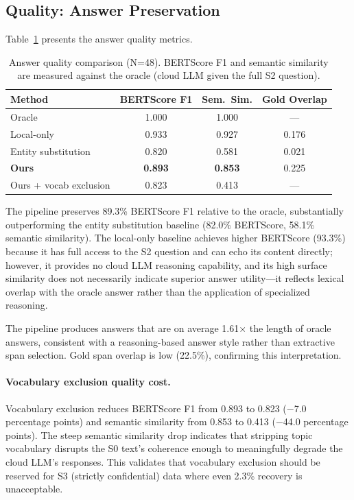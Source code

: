 \documentclass[sigconf,anonymous,review,balance=false]{acmart}
\begin{document}
\subsection{Quality: Answer Preservation}
\label{sec:quality-results}

Table~\ref{tab:quality} presents the answer quality metrics.

\begin{table}[t]
\caption{Answer quality comparison (N=48). BERTScore F1 and semantic similarity are measured against the oracle (cloud LLM given the full S2 question).}
\label{tab:quality}
\begin{tabular}{lccc}
\toprule
\textbf{Method} & \textbf{BERTScore F1} & \textbf{Sem.\ Sim.} & \textbf{Gold Overlap} \\
\midrule
Oracle & 1.000 & 1.000 & --- \\
Local-only & 0.933 & 0.927 & 0.176 \\
Entity substitution & 0.820 & 0.581 & 0.021 \\
\textbf{Ours} & \textbf{0.893} & \textbf{0.853} & 0.225 \\
Ours + vocab exclusion & 0.823 & 0.413 & --- \\
\bottomrule
\end{tabular}
\end{table}

The pipeline preserves 89.3\% BERTScore F1 relative to the oracle, substantially outperforming the entity substitution baseline (82.0\% BERTScore, 58.1\% semantic similarity). The local-only baseline achieves higher BERTScore (93.3\%) because it has full access to the S2 question and can echo its content directly; however, it provides no cloud LLM reasoning capability, and its high surface similarity does not necessarily indicate superior answer utility---it reflects lexical overlap with the oracle answer rather than the application of specialized reasoning.

The pipeline produces answers that are on average 1.61$\times$ the length of oracle answers, consistent with a reasoning-based answer style rather than extractive span selection. Gold span overlap is low (22.5\%), confirming this interpretation.

\paragraph{Vocabulary exclusion quality cost.} Vocabulary exclusion reduces BERTScore F1 from 0.893 to 0.823 ($-$7.0 percentage points) and semantic similarity from 0.853 to 0.413 ($-$44.0 percentage points). The steep semantic similarity drop indicates that stripping topic vocabulary disrupts the S0 text's coherence enough to meaningfully degrade the cloud LLM's responses. This validates that vocabulary exclusion should be reserved for S3 (strictly confidential) data where even 2.3\% recovery is unacceptable.
\end{document}
